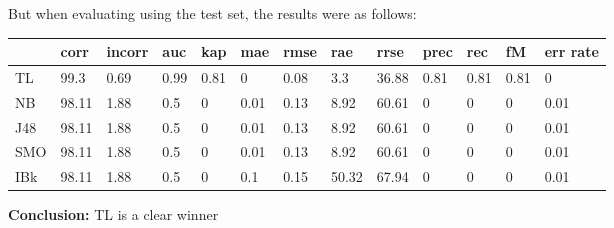 \documentclass[a4paper,12pt, english]{article}
\begin{document}
But when evaluating using the test set, the results were as follows:
\begin{small}
\begin{center}
    \begin{tabular}{ | l | l | l | l | l | l | l | l | l | l | l | l | l |}
    \hline
      	& corr & incorr  & auc & kap & mae & rmse & rae & rrse & prec & rec & fM & err rate\\ \hline
      	TL & 99.3 & 0.69 & 0.99 & 0.81 & 0 & 0.08 & 3.3 & 36.88 & 0.81 & 0.81 & 0.81 & 0\\ \hline
	NB & 98.11 & 1.88 & 0.5 & 0 & 0.01 & 0.13 & 8.92 & 60.61 & 0 & 0 & 0 & 0.01\\ \hline
	J48 & 98.11 & 1.88 & 0.5 & 0 & 0.01 & 0.13 & 8.92 & 60.61 & 0 & 0 & 0 & 0.01\\ \hline
	SMO & 98.11 & 1.88 & 0.5 & 0 & 0.01 & 0.13 & 8.92 & 60.61 & 0 & 0 & 0 & 0.01\\ \hline
	IBk & 98.11 & 1.88 & 0.5 & 0 & 0.1 & 0.15 & 50.32 & 67.94 & 0 & 0 & 0 & 0.01\\ \hline  
    \end{tabular}       
\end{center}
\end{small}
\textbf{Conclusion:} TL is a clear winner

\newpage
\end{document}
